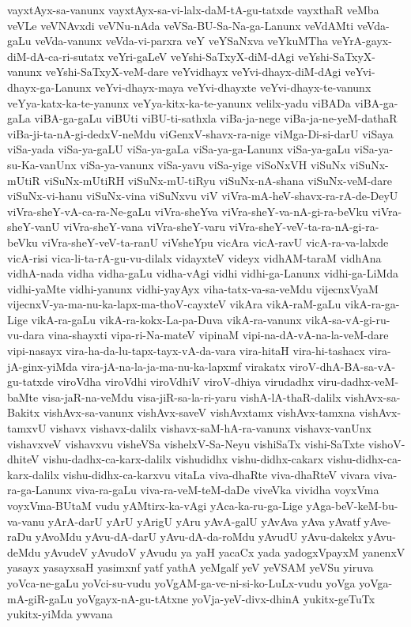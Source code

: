 {vayxtAyx-sa-vanunx
vayxtAyx-sa-vi-lalx-daM-tA-gu-tatxde
vayxthaR
veMba
veVLe
veVNAvxdi
veVNu-nAda
veVSa-BU-Sa-Na-ga-Lanunx
veVdAMti
veVda-gaLu
veVda-vanunx
veVda-vi-parxra
veY
veYSaNxva
veYkuMTha
veYrA-gayx-diM-dA-ca-ri-sutatx
veYri-gaLeV
veYshi-SaTxyX-diM-dAgi
veYshi-SaTxyX-vanunx
veYshi-SaTxyX-veM-dare
veYvidhayx
veYvi-dhayx-diM-dAgi
veYvi-dhayx-ga-Lanunx
veYvi-dhayx-maya
veYvi-dhayxte
veYvi-dhayx-te-vanunx
veYya-katx-ka-te-yanunx
veYya-kitx-ka-te-yanunx
velilx-yadu
viBADa
viBA-ga-gaLa
viBA-ga-gaLu
viBUti
viBU-ti-sathxla
viBa-ja-nege
viBa-ja-ne-yeM-dathaR
viBa-ji-ta-nA-gi-dedxV-neMdu
viGenxV-shavx-ra-nige
viMga-Di-si-darU
viSaya
viSa-yada
viSa-ya-gaLU
viSa-ya-gaLa
viSa-ya-ga-Lanunx
viSa-ya-gaLu
viSa-ya-su-Ka-vanUnx
viSa-ya-vanunx
viSa-yavu
viSa-yige
viSoNxVH
viSuNx
viSuNx-mUtiR
viSuNx-mUtiRH
viSuNx-mU-tiRyu
viSuNx-nA-shana
viSuNx-veM-dare
viSuNx-vi-hanu
viSuNx-vina
viSuNxvu
viV
viVra-mA-heV-shavx-ra-rA-de-DeyU
viVra-sheY-vA-ca-ra-Ne-gaLu
viVra-sheYva
viVra-sheY-va-nA-gi-ra-beVku
viVra-sheY-vanU
viVra-sheY-vana
viVra-sheY-varu
viVra-sheY-veV-ta-ra-nA-gi-ra-beVku
viVra-sheY-veV-ta-ranU
viVsheYpu
vicAra
vicA-ravU
vicA-ra-va-lalxde
vicA-risi
vica-li-ta-rA-gu-vu-dilalx
vidayxteV
videyx
vidhAM-taraM
vidhAna
vidhA-nada
vidha
vidha-gaLu
vidha-vAgi
vidhi
vidhi-ga-Lanunx
vidhi-ga-LiMda
vidhi-yaMte
vidhi-yanunx
vidhi-yayAyx
viha-tatx-va-sa-veMdu
vijecnxVyaM
vijecnxV-ya-ma-nu-ka-lapx-ma-thoV-cayxteV
vikAra
vikA-raM-gaLu
vikA-ra-ga-Lige
vikA-ra-gaLu
vikA-ra-kokx-La-pa-Duva
vikA-ra-vanunx
vikA-sa-vA-gi-ru-vu-dara
vina-shayxti
vipa-ri-Na-mateV
vipinaM
vipi-na-dA-vA-na-la-veM-dare
vipi-nasayx
vira-ha-da-lu-tapx-tayx-vA-da-vara
vira-hitaH
vira-hi-tashacx
vira-jA-ginx-yiMda
vira-jA-na-la-ja-ma-nu-ka-lapxmf
virakatx
viroV-dhA-BA-sa-vA-gu-tatxde
viroVdha
viroVdhi
viroVdhiV
viroV-dhiya
virudadhx
viru-dadhx-veM-baMte
visa-jaR-na-veMdu
visa-jiR-sa-la-ri-yaru
vishA-lA-thaR-dalilx
vishAvx-sa-Bakitx
vishAvx-sa-vanunx
vishAvx-saveV
vishAvxtamx
vishAvx-tamxna
vishAvx-tamxvU
vishavx
vishavx-dalilx
vishavx-saM-hA-ra-vanunx
vishavx-vanUnx
vishavxveV
vishavxvu
visheVSa
vishelxV-Sa-Neyu
vishiSaTx
vishi-SaTxte
vishoV-dhiteV
vishu-dadhx-ca-karx-dalilx
vishudidhx
vishu-didhx-cakarx
vishu-didhx-ca-karx-dalilx
vishu-didhx-ca-karxvu
vitaLa
viva-dhaRte
viva-dhaRteV
vivara
viva-ra-ga-Lanunx
viva-ra-gaLu
viva-ra-veM-teM-daDe
viveVka
vividha
voyxVma
voyxVma-BUtaM
vudu
yAMtirx-ka-vAgi
yAca-ka-ru-ga-Lige
yAga-beV-keM-bu-va-vanu
yArA-darU
yArU
yArigU
yAru
yAvA-galU
yAvAva
yAva
yAvatf
yAve-raDu
yAvoMdu
yAvu-dA-darU
yAvu-dA-da-roMdu
yAvudU
yAvu-dakekx
yAvu-deMdu
yAvudeV
yAvudoV
yAvudu
ya
yaH
yacaCx
yada
yadogxVpayxM
yanenxV
yasayx
yasayxsaH
yasimxnf
yatf
yathA
yeMgalf
yeV
yeVSAM
yeVSu
yiruva
yoVca-ne-gaLu
yoVci-su-vudu
yoVgAM-ga-ve-ni-si-ko-LuLx-vudu
yoVga
yoVga-mA-giR-gaLu
yoVgayx-nA-gu-tAtxne
yoVja-yeV-divx-dhinA
yukitx-geTuTx
yukitx-yiMda
ywvana
}
